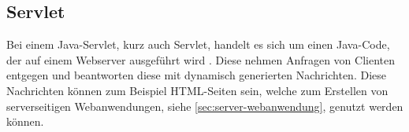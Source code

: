 \subsection{Servlet}
Bei einem Java-Servlet, kurz auch Servlet, handelt es sich um einen Java-Code, der auf einem Webserver ausgeführt wird \cite[S. 93]{Wissmann2012}. Diese nehmen Anfragen von Clienten entgegen und beantworten diese mit dynamisch generierten Nachrichten. Diese Nachrichten können zum Beispiel HTML-Seiten sein, welche zum Erstellen von serverseitigen Webanwendungen, siehe \autoref{sec:server-webanwendung}, genutzt werden können.